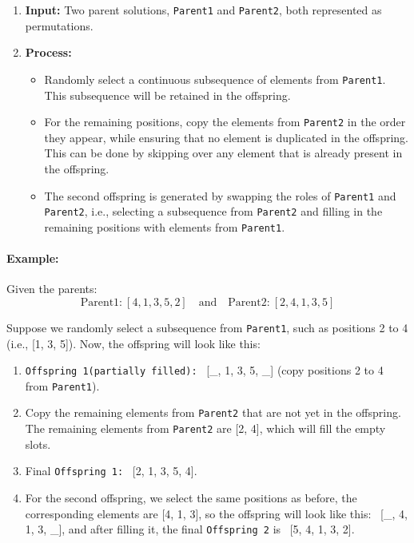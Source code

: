 \documentclass[11pt]{article}
\begin{document}
\begin{enumerate}
    \item \textbf{Input:} Two parent solutions, \texttt{Parent1} and \texttt{Parent2}, both represented as permutations.
    \item \textbf{Process:}
    \begin{itemize}
        \item Randomly select a continuous subsequence of elements from \texttt{Parent1}. This subsequence will be retained in the offspring.
        \item For the remaining positions, copy the elements from \texttt{Parent2} in the order they appear, while ensuring that no element is duplicated in the offspring. This can be done by skipping over any element that is already present in the offspring.
        \item The second offspring is generated by swapping the roles of \texttt{Parent1} and \texttt{Parent2}, i.e., selecting a subsequence from \texttt{Parent2} and filling in the remaining positions with elements from \texttt{Parent1}.
    \end{itemize}
\end{enumerate}

\paragraph{Example:}

Given the parents:
\[
\text{Parent1:} \ [4, 1, 3, 5, 2]
\quad \text{and} \quad \text{Parent2:} \ [2, 4, 1, 3, 5]
\]

Suppose we randomly select a subsequence from \texttt{Parent1}, such as positions 2 to 4 (i.e., [1, 3, 5]). Now, the offspring will look like this:

\begin{enumerate}
    \item \texttt{Offspring 1(partially filled):} \ [\_, 1, 3, 5, \_] (copy positions 2 to 4 from \texttt{Parent1}).
    \item Copy the remaining elements from \texttt{Parent2} that are not yet in the offspring. The remaining elements from \texttt{Parent2} are [2, 4], which will fill the empty slots.
    \item Final \texttt{Offspring 1:} \ [2, 1, 3, 5, 4].
    \item For the second offspring, we select the same positions as before, the corresponding elements are [4, 1, 3], so the offspring will look like this: \ [\_, 4, 1, 3, \_], and after filling it, the final \texttt{Offspring 2} is \ [5, 4, 1, 3, 2].
\end{enumerate}
\end{document}
